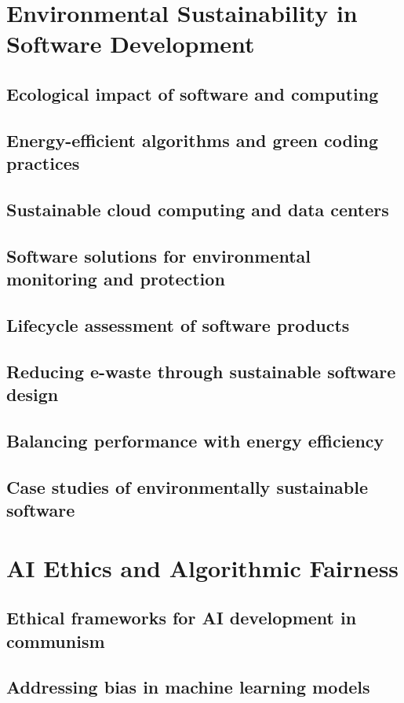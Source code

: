 \newpage

\section{Environmental Sustainability in Software Development}
\subsection{Ecological impact of software and computing}
\subsection{Energy-efficient algorithms and green coding practices}
\subsection{Sustainable cloud computing and data centers}
\subsection{Software solutions for environmental monitoring and protection}
\subsection{Lifecycle assessment of software products}
\subsection{Reducing e-waste through sustainable software design}
\subsection{Balancing performance with energy efficiency}
\subsection{Case studies of environmentally sustainable software}

\newpage

\section{AI Ethics and Algorithmic Fairness}
\subsection{Ethical frameworks for AI development in communism}
\subsection{Addressing bias in machine learning models}
